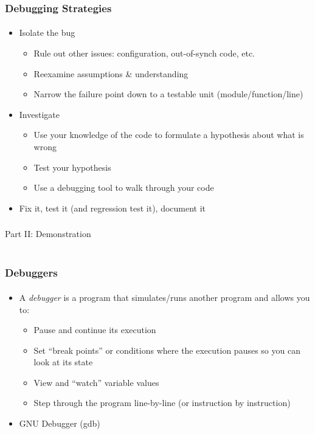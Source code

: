 \documentclass[]{beamer}
\begin{document}
\begin{frame}
  \frametitle{Debugging Strategies}
  \framesubtitle{}

\begin{itemize}[<+->] 
    \item Isolate the bug
  \begin{itemize}
    \item Rule out other issues: configuration, out-of-synch code, etc.
    \item Reexamine assumptions \& understanding 
    \item Narrow the failure point down to a testable unit (module/function/line)
  \end{itemize}
  \item Investigate
  \begin{itemize}
    \item Use your knowledge of the code to formulate a hypothesis about what is wrong
    \item Test your hypothesis
    \item Use a debugging tool to walk through your code
  \end{itemize}
  \item Fix it, test it (and regression test it), document it
\end{itemize}
  
\end{frame}

\begin{frame}
    \frametitle{}
    \framesubtitle{}
    
    \begin{center}
    {\Huge Part II: Demonstration}\\
    {\Large ~}
    \end{center}

\end{frame}


\begin{frame}[fragile]
    \frametitle{Debuggers}
    \framesubtitle{}

\begin{itemize}[<+->]
  \item A \emph{debugger} is a program that simulates/runs 
  another program and allows you to:
  \begin{itemize}
    \item Pause and continue its execution
    \item Set ``break points'' or conditions where the execution pauses so you can look at its state
    \item View and ``watch'' variable values
    \item Step through the program line-by-line (or instruction by instruction)
  \end{itemize}
  \item GNU Debugger (gdb)
\end{itemize}

\end{frame}
\end{document}
